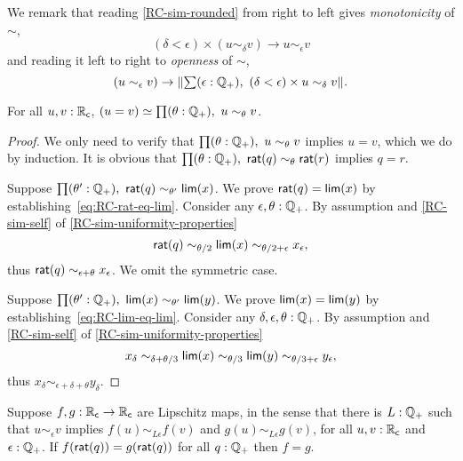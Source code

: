 \noindent
We remark that reading \autoref{RC-sim-rounded} from right to left gives
\emph{monotonicity} of $\sim$,
%
\begin{equation*}
  (\delta < \epsilon) \times (u \sim_\delta v) \to u \sim_\epsilon v
\end{equation*}
%
and reading it left to right to \emph{openness} of $\sim$,
%
\begin{equation*}
  (u \sim_\epsilon v) \to \brck{\sm{\epsilon : \Qp} (\delta < \epsilon) \times u \sim_\delta v}.
\end{equation*}

\begin{lem} \label{RC-weak-archimedean}
  For all $u, v : \mathbb{R}_\mathsf{c}$, $\eqv{(u = v)}{\prd{\theta : \Qp} u \sim_\theta v}$.
\end{lem}

\begin{proof}
  We only need to verify that $\prd{\theta : \Qp} u \sim_\theta v$ implies $u = v$,
  which we do by induction. It is obvious that $\prd{\theta : \Qp} \rcrat(q)
  \sim_\theta \rcrat(r)$ implies $q = r$.

  Suppose $\prd{\theta' : \Qp} \rcrat(q) \sim_{\theta'} \rclim(x)$. We prove $\mathsf{rat}(q) =
  \mathsf{lim}(x)$ by establishing~\eqref{eq:RC-rat-eq-lim}. Consider any $\epsilon, \theta :
  \mathbb{Q}_{+}$. By assumption and \autoref{RC-sim-self} of \autoref{RC-sim-uniformity-properties}
  \begin{equation*}
    \mathsf{rat}(q) \sim_{\theta/2} \mathsf{lim}(x) \sim_{\theta/2 + \epsilon} x_\epsilon,
  \end{equation*}
  thus $\mathsf{rat}(q) \sim_{\epsilon + \theta} x_\epsilon$. We omit the symmetric case.

  Suppose $\prd{\theta' : \Qp} \rclim(x) \sim_{\theta'} \rclim(y)$. We prove $\mathsf{lim}(x) =
  \mathsf{lim}(y)$ by establishing~\eqref{eq:RC-lim-eq-lim}. Consider any $\delta, \epsilon,
  \theta : \mathbb{Q}_{+}$. By assumption and \autoref{RC-sim-self} of
  \autoref{RC-sim-uniformity-properties}
  \begin{equation*}
    x_\delta \sim_{\delta + \theta/3}
    \mathsf{lim}(x) \sim_{\theta/3}
    \mathsf{lim}(y) \sim_{\theta/3 + \epsilon}
    y_\epsilon,
  \end{equation*}
  thus $x_\delta \sim_{\epsilon + \delta + \theta} y_\delta$.
\end{proof}

\begin{lemma} \label{RC-Lipschitz-eq}
  Suppose $f,g : \mathbb{R}_\mathsf{c} \to \mathbb{R}_\mathsf{c}$ are Lipschitz maps, in the sense that there is $L : \mathbb{Q}_{+}$
  such that $u \sim_\epsilon v$ implies $f(u) \sim_{L \epsilon} f(v)$ and $g(u) \sim_{L
    \epsilon} g(v)$, for all $u, v : \mathbb{R}_\mathsf{c}$ and $\epsilon : \mathbb{Q}_{+}$. If $f(\mathsf{rat}(q)) =
  g(\mathsf{rat}(q))$ for all $q : \mathbb{Q}_{+}$ then $f = g$.
\end{lemma}

